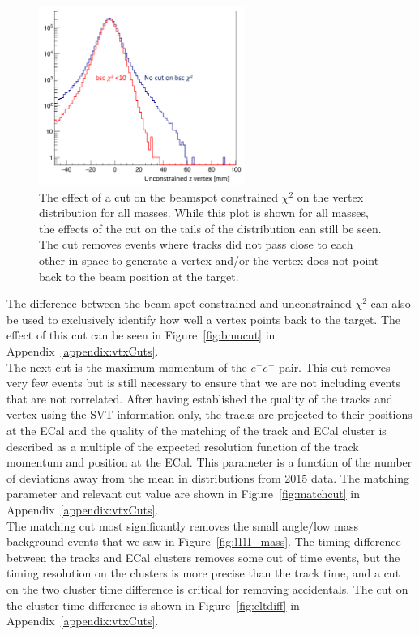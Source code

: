 \begin{figure}[htb]
  \centering
      \includegraphics[width=0.6\textwidth]{pics/searching/bscCut.png}
  \caption[Cut on beam spot constrained vertex $\chi^2$]{The effect of a cut on the beamspot constrained $\chi^2$ on the vertex distribution for all masses. While this plot is shown for all masses, the effects of the cut on the tails of the distribution can still be seen. The cut removes events where tracks did not pass close to each other in space to generate a vertex and/or the vertex does not point back to the beam position at the target.}
  \label{fig:bsccut}
\end{figure} 
The difference between the beam spot constrained and unconstrained $\chi^2$ can also be used to exclusively identify how well a vertex points back to the target. The effect of this cut can be seen in Figure~\ref{fig:bmucut} in Appendix~\ref{appendix:vtxCuts}.\\
\indent The next cut is the maximum momentum of the $e^+e^-$ pair. This cut removes very few events but is still necessary to ensure that we are not including events that are not correlated. After having established the quality of the tracks and vertex using the SVT information only, the tracks are projected to their positions at the ECal and the quality of the matching of the track and ECal cluster is described as a multiple of the expected resolution function of the track momentum and position at the ECal. This parameter is a function of the number of deviations away from the mean in distributions from 2015 data. The matching parameter and relevant cut value are shown in Figure~\ref{fig:matchcut} in Appendix~\ref{appendix:vtxCuts}. \\
\indent The matching cut most significantly removes the small angle/low mass background events that we saw in Figure~\ref{fig:l1l1_mass}. The timing difference between the tracks and ECal clusters removes some out of time events, but the timing resolution on the clusters is more precise than the track time, and a cut on the two cluster time difference is critical for removing accidentals. The cut on the cluster time difference is shown in Figure~\ref{fig:cltdiff} in Appendix~\ref{appendix:vtxCuts}.\\
